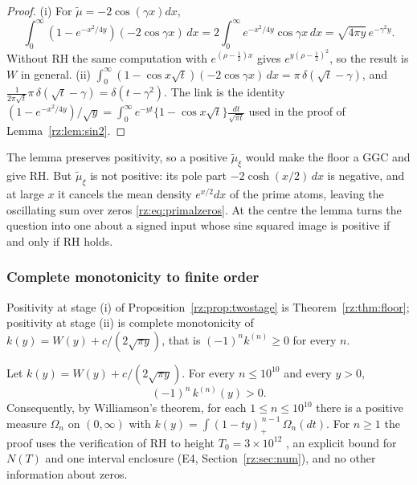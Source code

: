 \begin{proof}
(i) For $\tilde\mu=-2\cos(\gamma x)dx$,
\[
\int_0^\infty(1-e^{-x^2/4y})(-2\cos\gamma x)\,dx=2\int_0^\infty e^{-x^2/4y}\cos\gamma x\,dx=\sqrt{4\pi y}\,e^{-\gamma^2y}.
\]
Without RH the same computation with $e^{(\rho-\frac12)x}$ gives $e^{y(\rho-\frac12)^2}$, so the result is $W$ in general. (ii) $\int_0^\infty(1-\cos x\sqrt t)(-2\cos\gamma x)\,dx=\pi\,\delta(\sqrt t-\gamma)$, and $\frac{1}{2\pi\sqrt t}\pi\,\delta(\sqrt t-\gamma)=\delta(t-\gamma^2)$. The link is the identity $(1-e^{-x^2/4y})/\sqrt y=\int_0^\infty e^{-yt}\{1-\cos x\sqrt t\}\frac{dt}{\sqrt{\pi t}}$ used in the proof of Lemma~\ref{rz:lem:sin2}.
\end{proof}

The lemma preserves positivity, so a positive $\tilde\mu_\xi$ would make the floor a GGC and give RH. But $\tilde\mu_\xi$ is not positive: its pole part $-2\cosh(x/2)\,dx$ is negative, and at large $x$ it cancels the mean density $e^{x/2}dx$ of the prime atoms, leaving the oscillating sum over zeros \eqref{rz:eq:primalzeros}. At the centre the lemma turns the question into one about a signed input whose sine squared image is positive if and only if RH holds.

\subsubsection{Complete monotonicity to finite order}

Positivity at stage (i) of Proposition~\ref{rz:prop:twostage} is Theorem~\ref{rz:thm:floor}; positivity at stage (ii) is complete monotonicity of $k(y)=W(y)+c/(2\sqrt{\pi y})$, that is $(-1)^nk^{(n)}\ge0$ for every $n$.

\begin{theorem}\label{rz:thm:nmono}
Let $k(y)=W(y)+c/(2\sqrt{\pi y})$. For every $n\le10^{10}$ and every $y>0$,
\[
(-1)^n\,k^{(n)}(y)>0 .
\]
Consequently, by Williamson's theorem, for each $1\le n\le10^{10}$ there is a positive measure $\Omega_n$ on $(0,\infty)$ with $k(y)=\int(1-ty)_+^{\,n-1}\,\Omega_n(dt)$. For $n\ge1$ the proof uses the verification of RH to height $T_0=3\times10^{12}$ \cite{PT21}, an explicit bound for $N(T)$ \cite{HSW22} and one interval enclosure (E4, Section~\ref{rz:sec:num}), and no other information about zeros.
\end{theorem}

